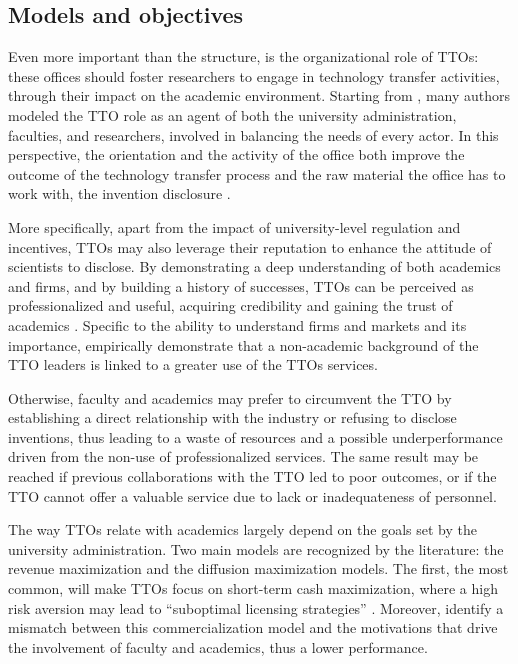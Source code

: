 \subsection{Models and objectives}

Even more important than the structure, is the organizational role of TTOs: these offices should foster researchers to engage in technology transfer activities, through their impact on the academic environment. Starting from \citet{Jensen1998}, many authors modeled the TTO role as an agent of both the university administration, faculties, and researchers, involved in balancing the needs of every actor. In this perspective, the orientation and the activity of the office both improve the outcome of the technology transfer process and the raw material the office has to work with, the invention disclosure \citep{Siegel2007}. 

More specifically, apart from the impact of university-level regulation and incentives, TTOs may also leverage their reputation to enhance the attitude of scientists to disclose. By demonstrating a deep understanding of both academics and firms, and by building a history of successes, TTOs can be perceived as professionalized and useful, acquiring credibility and gaining the trust of academics \citep{OwenSmith2001}. Specific to the ability to understand firms and markets and its importance, \citet{Muscio2010} empirically demonstrate that a non-academic background of the TTO leaders is linked to a greater use of the TTOs services.

Otherwise, faculty and academics may prefer to circumvent the TTO by establishing a direct relationship with the industry or refusing to disclose inventions, thus leading to a waste of resources and a possible underperformance driven from the non-use of professionalized services. The same result may be reached if previous collaborations with the TTO  led to poor outcomes, or if the TTO cannot offer a valuable service due to lack or inadequateness of personnel. 

The way TTOs relate with academics largely depend on the goals set by the university administration. Two main models are recognized by the literature: the revenue maximization and the diffusion maximization models. The first, the most common, will make TTOs focus on short-term cash maximization, where a high risk aversion may lead to \enquote{suboptimal licensing strategies} \citep{Markman2005}. Moreover, \citet{Siegel2003} identify a mismatch between this commercialization model and the motivations that drive the involvement of faculty and academics, thus a lower performance.

